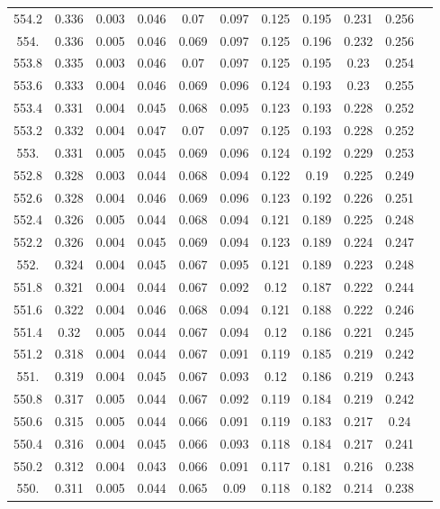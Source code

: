 \documentclass[12pt]{ctexart}
\numberwithin{equation}{section}
\begin{document}
\begin{longtable}{ccccccccccc}
554.2	&	0.336	&	0.003	&	0.046	&	0.07	&	0.097	&	0.125	&	0.195	&	0.231	&	0.256	\\
554.	&	0.336	&	0.005	&	0.046	&	0.069	&	0.097	&	0.125	&	0.196	&	0.232	&	0.256	\\
553.8	&	0.335	&	0.003	&	0.046	&	0.07	&	0.097	&	0.125	&	0.195	&	0.23	&	0.254	\\
553.6	&	0.333	&	0.004	&	0.046	&	0.069	&	0.096	&	0.124	&	0.193	&	0.23	&	0.255	\\
553.4	&	0.331	&	0.004	&	0.045	&	0.068	&	0.095	&	0.123	&	0.193	&	0.228	&	0.252	\\
553.2	&	0.332	&	0.004	&	0.047	&	0.07	&	0.097	&	0.125	&	0.193	&	0.228	&	0.252	\\
553.	&	0.331	&	0.005	&	0.045	&	0.069	&	0.096	&	0.124	&	0.192	&	0.229	&	0.253	\\
552.8	&	0.328	&	0.003	&	0.044	&	0.068	&	0.094	&	0.122	&	0.19	&	0.225	&	0.249	\\
552.6	&	0.328	&	0.004	&	0.046	&	0.069	&	0.096	&	0.123	&	0.192	&	0.226	&	0.251	\\
552.4	&	0.326	&	0.005	&	0.044	&	0.068	&	0.094	&	0.121	&	0.189	&	0.225	&	0.248	\\
552.2	&	0.326	&	0.004	&	0.045	&	0.069	&	0.094	&	0.123	&	0.189	&	0.224	&	0.247	\\
552.	&	0.324	&	0.004	&	0.045	&	0.067	&	0.095	&	0.121	&	0.189	&	0.223	&	0.248	\\
551.8	&	0.321	&	0.004	&	0.044	&	0.067	&	0.092	&	0.12	&	0.187	&	0.222	&	0.244	\\
551.6	&	0.322	&	0.004	&	0.046	&	0.068	&	0.094	&	0.121	&	0.188	&	0.222	&	0.246	\\
551.4	&	0.32	&	0.005	&	0.044	&	0.067	&	0.094	&	0.12	&	0.186	&	0.221	&	0.245	\\
551.2	&	0.318	&	0.004	&	0.044	&	0.067	&	0.091	&	0.119	&	0.185	&	0.219	&	0.242	\\
551.	&	0.319	&	0.004	&	0.045	&	0.067	&	0.093	&	0.12	&	0.186	&	0.219	&	0.243	\\
550.8	&	0.317	&	0.005	&	0.044	&	0.067	&	0.092	&	0.119	&	0.184	&	0.219	&	0.242	\\
550.6	&	0.315	&	0.005	&	0.044	&	0.066	&	0.091	&	0.119	&	0.183	&	0.217	&	0.24	\\
550.4	&	0.316	&	0.004	&	0.045	&	0.066	&	0.093	&	0.118	&	0.184	&	0.217	&	0.241	\\
550.2	&	0.312	&	0.004	&	0.043	&	0.066	&	0.091	&	0.117	&	0.181	&	0.216	&	0.238	\\
550.	&	0.311	&	0.005	&	0.044	&	0.065	&	0.09	&	0.118	&	0.182	&	0.214	&	0.238	\\

\end{longtable}
\end{document}
